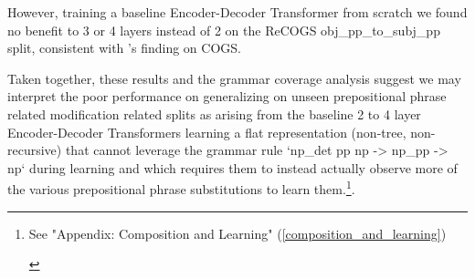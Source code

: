\documentclass[11pt]{article}
\begin{document}
However, training a \cite{Wu2023} baseline Encoder-Decoder Transformer from scratch we found no benefit to 3 or 4 layers instead of 2 on the ReCOGS obj\_pp\_to\_subj\_pp split, consistent with \cite{petty2024impactdepthcompositionalgeneralization}'s finding on COGS.

Taken together, these results and the grammar coverage analysis suggest we may interpret the poor performance on generalizing on unseen prepositional phrase related modification related splits as arising from the baseline 2 to 4 layer Encoder-Decoder Transformers learning a flat representation (non-tree, non-recursive) that cannot leverage the grammar rule `np\_det pp np -> np\_pp -> np` during learning and which requires them to instead actually observe more of the various prepositional phrase substitutions to learn them.\footnote{\begin{footnotesize}See "Appendix: Composition and Learning" (\ref{composition_and_learning})\end{footnotesize}}.
\end{document}
